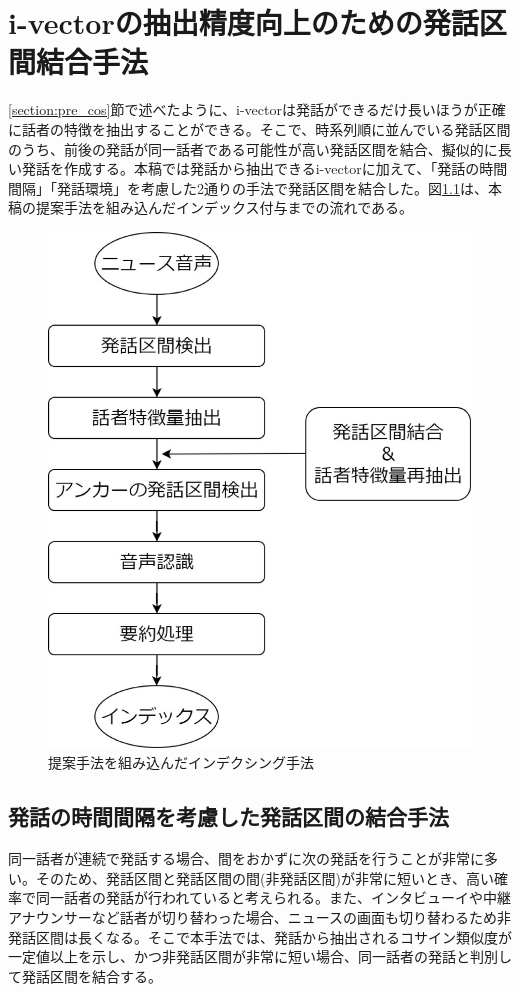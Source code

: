 \chapter{i-vectorの抽出精度向上のための発話区間結合手法}
\label{chapter:prob_method}
\ref{section:pre_cos}節で述べたように、i-vectorは発話ができるだけ長いほうが正確に話者の特徴を抽出することができる。そこで、時系列順に並んでいる発話区間のうち、前後の発話が同一話者である可能性が高い発話区間を結合、擬似的に長い発話を作成する。本稿では発話から抽出できるi-vectorに加えて、「発話の時間間隔」「発話環境」を考慮した2通りの手法で発話区間を結合した。図\ref{fig:indexing2}は、本稿の提案手法を組み込んだインデックス付与までの流れである。

\begin{figure}[H]
  \begin{center}
    \includegraphics[scale=0.3]{./figure/indexing2.eps}
  \end{center}
  \caption{提案手法を組み込んだインデクシング手法 \label{fig:indexing2}}
\end{figure}

\section{発話の時間間隔を考慮した発話区間の結合手法}
\label{prob1}
同一話者が連続で発話する場合、間をおかずに次の発話を行うことが非常に多い。そのため、発話区間と発話区間の間(非発話区間)が非常に短いとき、高い確率で同一話者の発話が行われていると考えられる。また、インタビューイや中継アナウンサーなど話者が切り替わった場合、ニュースの画面も切り替わるため非発話区間は長くなる。そこで本手法では、発話から抽出されるコサイン類似度が一定値以上を示し、かつ非発話区間が非常に短い場合、同一話者の発話と判別して発話区間を結合する。


